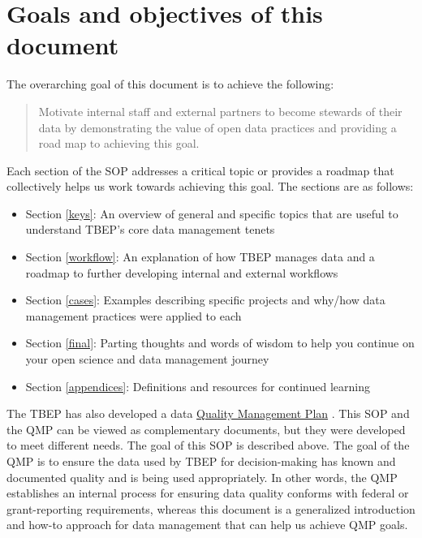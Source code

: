 \documentclass[
]{book}
\providecommand{\tightlist}{%
  \setlength{\itemsep}{0pt}\setlength{\parskip}{0pt}}
\begin{document}
\hypertarget{goals-and-objectives-of-this-document}{%
\section{Goals and objectives of this document}\label{goals-and-objectives-of-this-document}}

The overarching goal of this document is to achieve the following:

\begin{quote}
Motivate internal staff and external partners to become stewards of their data by demonstrating the value of open data practices and providing a road map to achieving this goal.
\end{quote}

Each section of the SOP addresses a critical topic or provides a roadmap that collectively helps us work towards achieving this goal. The sections are as follows:

\begin{itemize}
\tightlist
\item
  Section \ref{keys}: An overview of general and specific topics that are useful to understand TBEP's core data management tenets
\item
  Section \ref{workflow}: An explanation of how TBEP manages data and a roadmap to further developing internal and external workflows
\item
  Section \ref{cases}: Examples describing specific projects and why/how data management practices were applied to each
\item
  Section \ref{final}: Parting thoughts and words of wisdom to help you continue on your open science and data management journey
\item
  Section \ref{appendices}: Definitions and resources for continued learning
\end{itemize}

The TBEP has also developed a data \href{https://drive.google.com/file/d/1DyA0PNHV8rEXGMwGiyS7sXY1ECLYpJJO/view}{Quality Management Plan} \citep[QMP;][]{tbep1620}. This SOP and the QMP can be viewed as complementary documents, but they were developed to meet different needs. The goal of this SOP is described above. The goal of the QMP is to ensure the data used by TBEP for decision-making has known and documented quality and is being used appropriately. In other words, the QMP establishes an internal process for ensuring data quality conforms with federal or grant-reporting requirements, whereas this document is a generalized introduction and how-to approach for data management that can help us achieve QMP goals.
\end{document}
